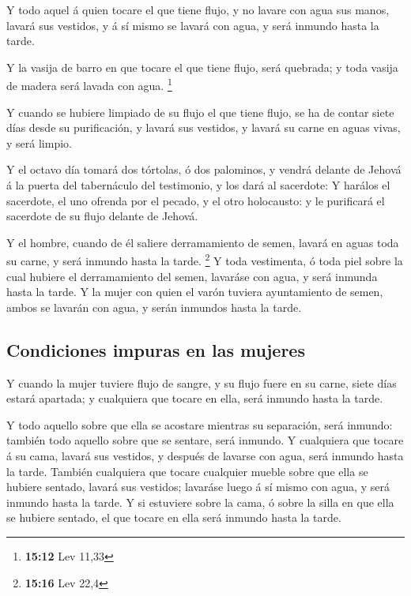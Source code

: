  Y todo aquel á quien tocare el que tiene flujo, y no
lavare con agua sus manos, lavará sus vestidos, y á sí mismo se lavará
con agua, y será inmundo hasta la tarde.

 Y la vasija de barro en que tocare el que tiene flujo,
será quebrada; y toda vasija de madera será lavada con agua. \footnote{\textbf{15:12}
  Lev 11,33}

 Y cuando se hubiere limpiado de su flujo el que tiene
flujo, se ha de contar siete días desde su purificación, y lavará sus
vestidos, y lavará su carne en aguas vivas, y será limpio.

 Y el octavo día tomará dos tórtolas, ó dos palominos, y
vendrá delante de Jehová á la puerta del tabernáculo del testimonio, y
los dará al sacerdote:  Y harálos el sacerdote, el uno
ofrenda por el pecado, y el otro holocausto: y le purificará el
sacerdote de su flujo delante de Jehová.

 Y el hombre, cuando de él saliere derramamiento de semen,
lavará en aguas toda su carne, y será inmundo hasta la tarde.
\footnote{\textbf{15:16} Lev 22,4}  Y toda vestimenta, ó
toda piel sobre la cual hubiere el derramamiento del semen, lavaráse con
agua, y será inmunda hasta la tarde.  Y la mujer con quien
el varón tuviera ayuntamiento de semen, ambos se lavarán con agua, y
serán inmundos hasta la tarde.

\hypertarget{condiciones-impuras-en-las-mujeres}{%
\subsection{Condiciones impuras en las
mujeres}\label{condiciones-impuras-en-las-mujeres}}

 Y cuando la mujer tuviere flujo de sangre, y su flujo
fuere en su carne, siete días estará apartada; y cualquiera que tocare
en ella, será inmundo hasta la tarde.

 Y todo aquello sobre que ella se acostare mientras su
separación, será inmundo: también todo aquello sobre que se sentare,
será inmundo.  Y cualquiera que tocare á su cama, lavará
sus vestidos, y después de lavarse con agua, será inmundo hasta la
tarde.  También cualquiera que tocare cualquier mueble
sobre que ella se hubiere sentado, lavará sus vestidos; lavaráse luego á
sí mismo con agua, y será inmundo hasta la tarde.  Y si
estuviere sobre la cama, ó sobre la silla en que ella se hubiere
sentado, el que tocare en ella será inmundo hasta la tarde.

